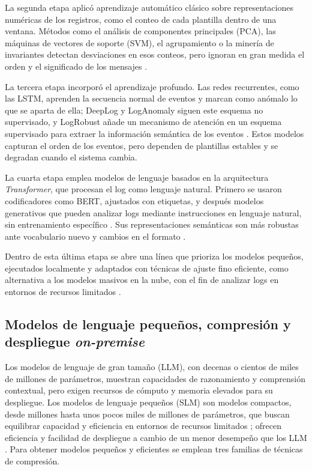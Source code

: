 La segunda etapa aplicó aprendizaje automático clásico sobre representaciones numéricas de los registros, como el conteo de cada plantilla dentro de una ventana. Métodos como el análisis de componentes principales (PCA), las máquinas de vectores de soporte (SVM), el agrupamiento o la minería de invariantes detectan desviaciones en esos conteos, pero ignoran en gran medida el orden y el significado de los mensajes \cite{he2021_survey} \cite{jiang2021_aiops}.

La tercera etapa incorporó el aprendizaje profundo. Las redes recurrentes, como las LSTM, aprenden la secuencia normal de eventos y marcan como anómalo lo que se aparta de ella; DeepLog y LogAnomaly siguen este esquema no supervisado, y LogRobust añade un mecanismo de atención en un esquema supervisado para extraer la información semántica de los eventos \cite{jiang2021_aiops} \cite{he2021_survey}. Estos modelos capturan el orden de los eventos, pero dependen de plantillas estables y se degradan cuando el sistema cambia.

La cuarta etapa emplea modelos de lenguaje basados en la arquitectura \textit{Transformer}, que procesan el log como lenguaje natural. Primero se usaron codificadores como BERT, ajustados con etiquetas, y después modelos generativos que pueden analizar logs mediante instrucciones en lenguaje natural, sin entrenamiento específico \cite{liu2024_logprompt}. Sus representaciones semánticas son más robustas ante vocabulario nuevo y cambios en el formato \cite{murphy2024_embeddings}.

Dentro de esta última etapa se abre una línea que prioriza los modelos pequeños, ejecutados localmente y adaptados con técnicas de ajuste fino eficiente, como alternativa a los modelos masivos en la nube, con el fin de analizar logs en entornos de recursos limitados \cite{saha2025_slm_minimal}.

\subsection{Modelos de lenguaje pequeños, compresión y despliegue \textit{on-premise}}\label{sec:mt_slm}

Los modelos de lenguaje de gran tamaño (LLM), con decenas o cientos de miles de millones de parámetros, muestran capacidades de razonamiento y comprensión contextual, pero exigen recursos de cómputo y memoria elevados para su despliegue. Los modelos de lenguaje pequeños (SLM) son modelos compactos, desde millones hasta unos pocos miles de millones de parámetros, que buscan equilibrar capacidad y eficiencia en entornos de recursos limitados \cite{wang2025_slm_survey}; ofrecen eficiencia y facilidad de despliegue a cambio de un menor desempeño que los LLM \cite{chen2025_collab_survey}. Para obtener modelos pequeños y eficientes se emplean tres familias de técnicas de compresión.

